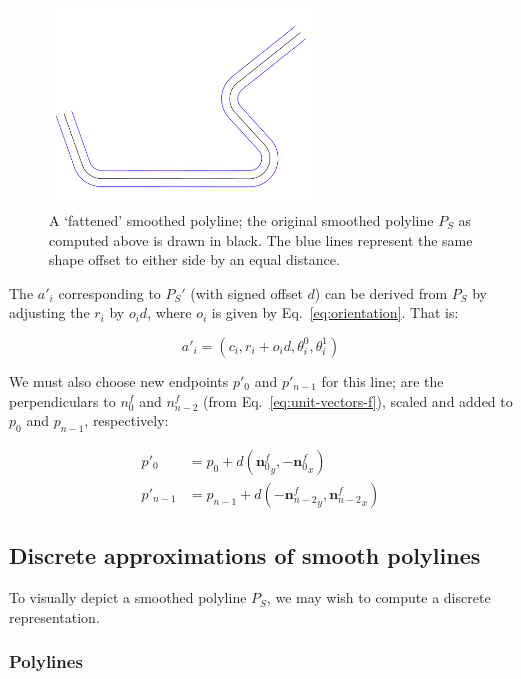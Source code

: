 \documentclass{article}
\begin{document}
\begin{figure}[h]
  \centering
  \includegraphics[width=7cm]{5}
  \caption{A `fattened' smoothed polyline; the original smoothed polyline $P_S$ as computed above is drawn in black.  The blue lines represent the same shape offset to either side by an equal distance.}
  \label{fig:fattened-polyline}
\end{figure}

The $a'_i$ corresponding to $P_S'$ (with signed offset $d$) can be derived from $P_S$ by adjusting the $r_i$ by $o_id$, where $o_i$ is given by Eq.~\eqref{eq:orientation}.  That is:

\begin{equation}
  \label{eq:arc-offset}
  a'_i = \left(c_i, r_i + o_id, \theta^0_i, \theta^1_i\right)
\end{equation}

We must also choose new endpoints $p'_0$ and $p'_{n-1}$ for this line;  are the perpendiculars to $n^f_0$ and $n^f_{n-2}$ (from Eq.~\eqref{eq:unit-vectors-f}), scaled and added to $p_0$ and $p_{n-1}$, respectively:

\begin{align}
  \label{eq:endpoints-prime}
  p'_0 &= p_0 + d \left({\mathbf{n}^f_0}_y, -{\mathbf{n}^f_0}_x\right)\\
  p'_{n-1} &= p_{n-1} + d \left(-{\mathbf{n}^f_{n-2}}_y, {\mathbf{n}^f_{n-2}}_x\right)
\end{align}

\subsection{Discrete approximations of smooth polylines}

To visually depict a smoothed polyline $P_S$, we may wish to compute a discrete representation.

\subsubsection{Polylines}
\end{document}
